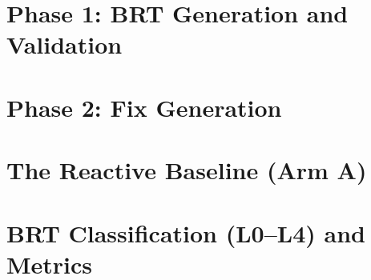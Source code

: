 \section{Phase 1: BRT Generation and Validation}
\label{sec:method-phase1}

\section{Phase 2: Fix Generation}
\label{sec:method-phase2}

\section{The Reactive Baseline (Arm A)}
\label{sec:method-baseline}

\section{BRT Classification (L0--L4) and Metrics}
\label{sec:method-levels}
